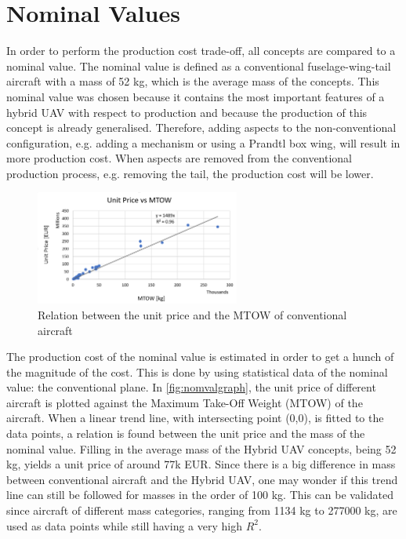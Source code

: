 \section{Nominal Values}
\label{sec:nomval}

In order to perform the production cost trade-off, all concepts are compared to a nominal value. The nominal value is defined as a conventional fuselage-wing-tail aircraft with a mass of 52 kg, which is the average mass of the concepts. This nominal value was chosen because it contains the most important features of a hybrid UAV with respect to production and because the production of this concept is already generalised. Therefore, adding aspects to the non-conventional configuration, e.g. adding a mechanism or using a Prandtl box wing, will result in more production cost. When aspects are removed from the conventional production process, e.g. removing the tail, the production cost will be lower.

\begin{figure}[H]
    \centering
    \includegraphics[width=0.6\textwidth]{CostAnalysis/Figures/Nomval}
    \caption{Relation between the unit price and the MTOW of conventional aircraft}
    \label{fig:nomvalgraph}
\end{figure}

The production cost of the nominal value is estimated in order to get a hunch of the magnitude of the cost. This is done by using statistical data of the nominal value: the conventional plane. In \autoref{fig:nomvalgraph}, the unit price of different aircraft is plotted against the Maximum Take-Off Weight (MTOW) of the aircraft. When a linear trend line, with intersecting point (0,0), is fitted to the data points, a relation is found between the unit price and the mass of the nominal value. Filling in the average mass of the Hybrid UAV concepts, being 52 kg, yields a unit price of around 77k EUR. Since there is a big difference in mass between conventional aircraft and the Hybrid UAV, one may wonder if this trend line can still be followed for masses in the order of 100 kg. This can be validated since aircraft of different mass categories, ranging from 1134 kg to 277000 kg, are used as data points while still having a very high $R^2$. \newline

